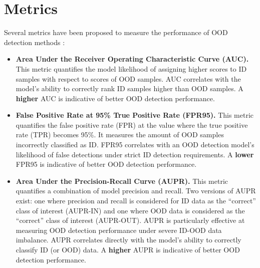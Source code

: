 \section{Metrics}
Several metrics have been proposed to measure the performance of OOD detection methods \cite{lu2024recent}:
\begin{itemize}
    \item \textbf{Area Under the Receiver Operating Characteristic Curve (AUC).} This metric quantifies the model likelihood of assigning higher scores to ID samples with respect to scores of OOD samples. AUC correlates with the model's ability to correctly rank ID samples higher than OOD samples. A \textbf{higher} AUC is indicative of better OOD detection performance.
    \item \textbf{False Positive Rate at 95\% True Positive Rate (FPR95).} This metric quantifies the false positive rate (FPR) at the value where the true positive rate (TPR) becomes 95\%. It measures the amount of OOD samples incorrectly classified as ID. FPR95 correlates with an OOD detection model's likelihood of false detections under strict ID detection requirements. A \textbf{lower} FPR95 is indicative of better OOD detection performance.
    \item \textbf{Area Under the Precision-Recall Curve (AUPR).} This metric quantifies a combination of model precision and recall. Two versions of AUPR exist: one where precision and recall is considered for ID data as the ``correct'' class of interest (AUPR-IN) and one where OOD data is considered as the ``correct'' class of interest (AUPR-OUT). AUPR is particularly effective at measuring OOD detection performance under severe ID-OOD data imbalance. AUPR correlates directly with the model's ability to correctly classify ID (or OOD) data. A \textbf{higher} AUPR is indicative of better OOD detection performance.
\end{itemize}

